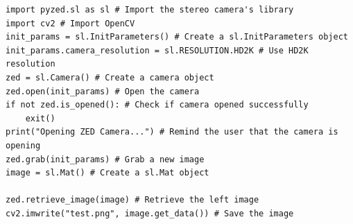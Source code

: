 \documentclass[balance,upint,subscriptcorrection,varvw,nofoot, mathalfa=cal=boondoxo,spanish,french,vietnamese,russian,greek,pdf-a,fontspec,colorlinks]{asmeconf}
\begin{document}
\begin{verbatim} 
import pyzed.sl as sl # Import the stereo camera's library
import cv2 # Import OpenCV
init_params = sl.InitParameters() # Create a sl.InitParameters object
init_params.camera_resolution = sl.RESOLUTION.HD2K # Use HD2K resolution
zed = sl.Camera() # Create a camera object
zed.open(init_params) # Open the camera
if not zed.is_opened(): # Check if camera opened successfully
	exit()
print("Opening ZED Camera...") # Remind the user that the camera is opening
zed.grab(init_params) # Grab a new image
image = sl.Mat() # Create a sl.Mat object

zed.retrieve_image(image) # Retrieve the left image
cv2.imwrite("test.png", image.get_data()) # Save the image
\end{verbatim} 

\end{document}
